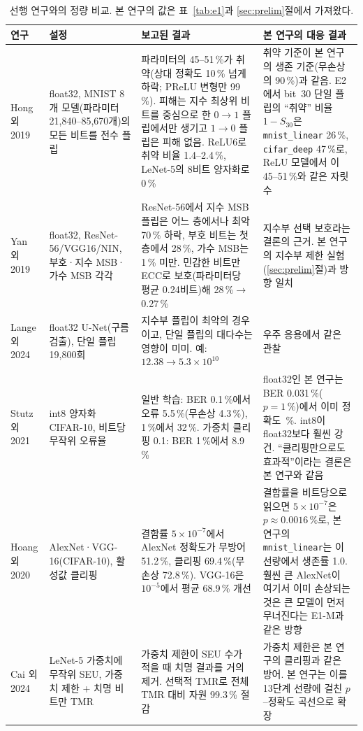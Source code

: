 \documentclass[11pt,a4paper]{article}
\newcommand{\code}[1]{\texttt{#1}}
\begin{document}
\begin{table}[!htb]
  \centering\scriptsize
  \caption{선행 연구와의 정량 비교. 본 연구의 값은 표~\ref{tab:e1}과 \ref{sec:prelim}절에서 가져왔다.}
  \label{tab:related}
  \begin{tabular}{p{2.5cm}p{3.3cm}p{4.0cm}p{4.0cm}}
    \toprule
    연구 & 설정 & 보고된 결과 & 본 연구의 대응 결과 \\
    \midrule
    Hong 외 2019~\citep{hong2019} & float32, MNIST 8개 모델(파라미터 21{,}840--85{,}670개)의 모든 비트를 전수 플립 & 파라미터의 45--51\,\%가 취약(상대 정확도 10\,\% 넘게 하락; PReLU 변형만 99\,\%). 피해는 지수 최상위 비트를 중심으로 한 $0\to1$ 플립에서만 생기고 $1\to0$ 플립은 피해 없음. ReLU6로 취약 비율 1.4--2.4\,\%, LeNet-5의 8비트 양자화로 0\,\% & 취약 기준이 본 연구의 생존 기준(무손상의 90\,\%)과 같음. E2에서 bit~30 단일 플립의 ``취약'' 비율 $1-S_{30}$은 \code{mnist\_linear} 26\,\%, \code{cifar\_deep} 47\,\%로, ReLU 모델에서 이 45--51\,\%와 같은 자릿수 \\
    \addlinespace
    Yan 외 2019~\citep{yan2019} & float32, ResNet-56/VGG16/NIN, 부호·지수 MSB·가수 MSB 각각 & ResNet-56에서 지수 MSB 플립은 어느 층에서나 최악 70\,\% 하락, 부호 비트는 첫 층에서 28\,\%, 가수 MSB는 1\,\% 미만. 민감한 비트만 ECC로 보호(파라미터당 평균 0.24비트)해 28\,\%$\to$0.27\,\% & 지수부 선택 보호라는 결론의 근거. 본 연구의 지수부 제한 실험(\ref{sec:prelim}절)과 방향 일치 \\
    \addlinespace
    Lange 외 2024~\citep{lange2024} & float32 U-Net(구름 검출), 단일 플립 19{,}800회 & 지수부 플립이 최악의 경우이고, 단일 플립의 대다수는 영향이 미미. 예: $12.38\to5.3\times10^{10}$ & 우주 응용에서 같은 관찰 \\
    \addlinespace
    Stutz 외 2021~\citep{stutz2021} & int8 양자화 CIFAR-10, 비트당 무작위 오류율 & 일반 학습: BER 0.1\,\%에서 오류 5.5\,\%(무손상 4.3\,\%), 1\,\%에서 32\,\%. 가중치 클리핑 0.1: BER 1\,\%에서 8.9\,\% & float32인 본 연구는 BER 0.031\,\%($p=1\,\%$)에서 이미 정확도 \pOneEmTwoNoneMed{}\,\%. int8이 float32보다 훨씬 강건. ``클리핑만으로도 효과적''이라는 결론은 본 연구와 같음 \\
    \addlinespace
    Hoang 외 2020~\citep{hoang2020} & AlexNet·VGG-16(CIFAR-10), 활성값 클리핑 & 결함률 $5\times10^{-7}$에서 AlexNet 정확도가 무방어 51.2\,\%, 클리핑 69.4\,\%(무손상 72.8\,\%). VGG-16은 $10^{-5}$에서 평균 68.9\,\% 개선 & 결함률을 비트당으로 읽으면 $5\times10^{-7}$은 $p\approx0.0016\,\%$로, 본 연구의 \code{mnist\_linear}는 이 선량에서 생존률 1.0. 훨씬 큰 AlexNet이 여기서 이미 손상되는 것은 큰 모델이 먼저 무너진다는 E1-M과 같은 방향 \\
    \addlinespace
    Cai 외 2024~\citep{cai2024} & LeNet-5 가중치에 무작위 SEU, 가중치 제한 + 치명 비트만 TMR & 가중치 제한이 SEU 수가 적을 때 치명 결과를 거의 제거. 선택적 TMR로 전체 TMR 대비 자원 99.3\,\% 절감 & 가중치 제한은 본 연구의 클리핑과 같은 방어. 본 연구는 이를 13단계 선량에 걸친 $p$--정확도 곡선으로 확장 \\
    \bottomrule
  \end{tabular}
\end{table}
\end{document}
